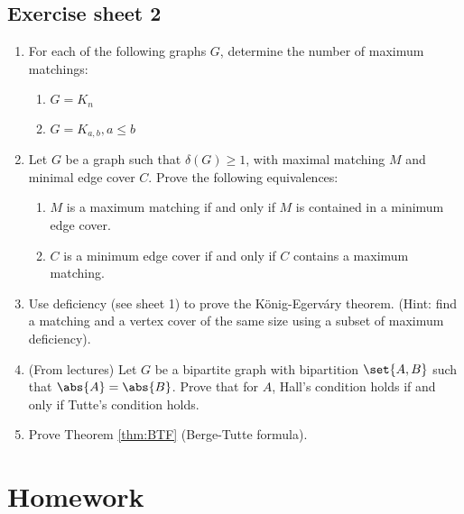 \subsection*{Exercise sheet 2}
\begin{enumerate}
    \item For each of the following graphs $G$, determine the number of maximum matchings:
    \begin{enumerate}
        \item $G = K_n$
        \item $G = K_{a,b}, a \leq b$
    \end{enumerate}
    
    \item Let $G$ be a graph such that $\delta(G) \geq 1$, with maximal matching $M$ and minimal edge cover $C$. 
    Prove the following equivalences:
    \begin{enumerate}
        \item $M$ is a maximum matching if and only if $M$ is contained in a minimum edge cover.
        \item $C$ is a minimum edge cover if and only if $C$ contains a maximum matching.
    \end{enumerate}
    
    \item Use deficiency (see sheet 1) to prove the König-Egerváry theorem. 
    (Hint: find a matching and a vertex cover of the same size using a subset of maximum deficiency).
    
    \item (From lectures) Let $G$ be a bipartite graph with bipartition $\set{A, B}$ such that $\abs{A} = \abs{B}$. 
    Prove that for $A$, Hall's condition holds if and only if Tutte's condition holds.
    
    \item Prove Theorem \ref{thm:BTF} (Berge-Tutte formula).
\end{enumerate}

\newpage
\section{Homework}

